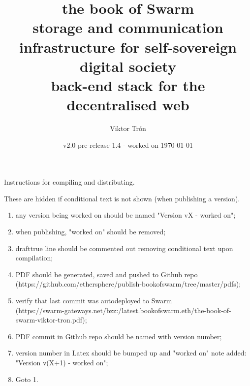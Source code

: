       
\makeglossaries
\title{\Huge\sc the book of Swarm\\
\Large storage and communication infrastructure for self-sovereign digital society\\
back-end stack for the decentralised web}
\author{Viktor Trón}
\date{v2.0 pre-release 1.4 - worked on  \today}
%

\frontmatter
\maketitle
\ifdraft
Instructions for compiling and distributing.

These are hidden if conditional text is not shown (when publishing a version).

\begin{enumerate}[noitemsep]
    \item any version being worked on should be named "Version vX - worked on";
    \item when publishing, "worked on" should be removed; 
    \item drafttrue line should be commented out removing conditional text upon compilation;
    \item PDF should be generated, saved and pushed to Github repo \\ (https://github.com/ethersphere/publish-bookofswarm/tree/master/pdfs); 
    \item verify that last commit was autodeployed to Swarm \\ (https://swarm-gateways.net/bzz:/latest.bookofswarm.eth/the-book-of-swarm-viktor-tron.pdf);
    \item PDF commit in Github repo should be named with version number;
    \item version number in Latex should be bumped up and "worked on" note added: "Version v(X+1) - worked on";
    \item Goto 1.
\end{enumerate}
\fi
%

\tableofcontents
\listoffigures

\label{sec:toc}
 
\mainmatter
